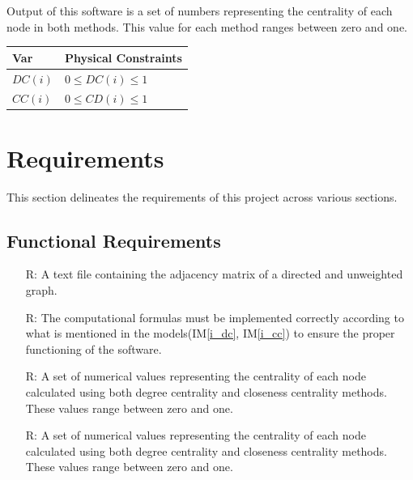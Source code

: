 \documentclass[12pt]{article}
\newcommand{\iref}[1]{IM\ref{#1}}
\newcounter{reqnum} %
\begin{document}
\noindent
Output of this software is a set of numbers representing the centrality of each node in both methods. This value for each method ranges between zero and one.
\begin{table}[!h]
\caption{Output Variables} \label{TblOutputVar}
\renewcommand{\arraystretch}{1.2}
\noindent \begin{longtable*}{l l} 
  \toprule
  \textbf{Var} & \textbf{Physical Constraints} \\
  \midrule 
  $DC(i)$ & $ 0 \leq DC(i) \leq 1$
  \\
 $CC(i)$ & $ 0 \leq CD(i) \leq 1$
\\
  \bottomrule
\end{longtable*}
\end{table}


\section{Requirements}

This section delineates the requirements of this project across various sections.

\subsection{Functional Requirements}

\noindent \begin{itemize}

\item[R\refstepcounter{reqnum}\thereqnum \label{R_Inputs}:] A text file containing the adjacency matrix of a directed and unweighted graph.
\item[R\refstepcounter{reqnum}\thereqnum \label{R_Calculate}:] The computational formulas must be implemented correctly according to what is mentioned in the models(\iref{i_dc}, \iref{i_cc}) to ensure the proper functioning of the software.

\item[R\refstepcounter{reqnum}\thereqnum \label{R_VerifyOutput}:]
 A set of numerical values representing the centrality of each node calculated using both degree centrality and closeness centrality methods. These values range between zero and one.

\item[R\refstepcounter{reqnum}\thereqnum \label{R_Output}:] A set of numerical values representing the centrality of each node calculated using both degree centrality and closeness centrality methods. These values range between zero and one.

\end{itemize}
\end{document}
